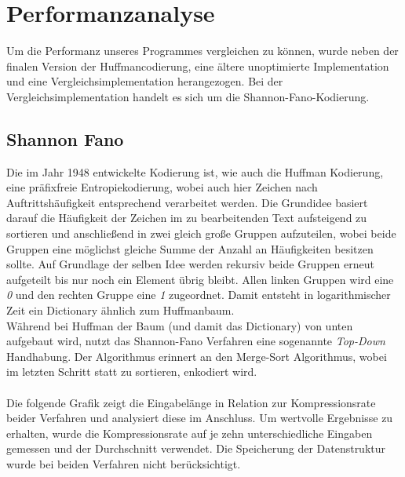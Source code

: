 \documentclass[course=erap]{aspdoc}
\begin{document}
\section{Performanzanalyse}

Um die Performanz unseres Programmes vergleichen zu können, wurde neben der finalen Version der Huffmancodierung, eine ältere unoptimierte Implementation und eine Vergleichsimplementation herangezogen. Bei der Vergleichsimplementation handelt es sich um die Shannon-Fano-Kodierung.\cite{xie-no-date}

\subsection{Shannon Fano}
Die im Jahr 1948 entwickelte Kodierung ist, wie auch die Huffman Kodierung, eine präfixfreie Entropiekodierung, wobei auch hier Zeichen nach Auftrittshäufigkeit entsprechend verarbeitet werden. Die Grundidee basiert darauf die Häufigkeit der Zeichen im zu bearbeitenden Text aufsteigend zu sortieren und anschließend in zwei gleich große Gruppen aufzuteilen, wobei beide Gruppen eine möglichst gleiche Summe der Anzahl an Häufigkeiten besitzen sollte. Auf Grundlage der selben Idee werden rekursiv beide Gruppen erneut aufgeteilt bis nur noch ein Element übrig bleibt. Allen linken Gruppen wird eine \textit{0} und den rechten Gruppe eine \textit{1} zugeordnet. Damit entsteht in logarithmischer Zeit ein Dictionary ähnlich zum Huffmanbaum.\\
Während bei Huffman der Baum (und damit das Dictionary) von unten aufgebaut wird, nutzt das Shannon-Fano Verfahren eine sogenannte \textit{Top-Down} Handhabung. Der Algorithmus erinnert an den Merge-Sort Algorithmus, wobei im letzten Schritt statt zu sortieren, enkodiert wird.\\\\
Die folgende Grafik zeigt die Eingabelänge in Relation zur Kompressionsrate beider Verfahren und analysiert diese im Anschluss. Um wertvolle Ergebnisse zu erhalten, wurde die Kompressionsrate auf je zehn unterschiedliche Eingaben gemessen und der Durchschnitt verwendet. Die Speicherung der Datenstruktur wurde bei beiden Verfahren nicht berücksichtigt.\\
\begin{center}
\end{center}
\end{document}
